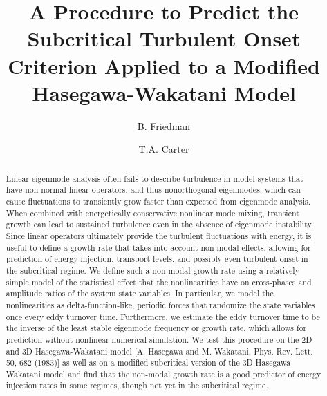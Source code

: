 \documentclass[twocolumn,showkeys,superscriptaddress]{revtex4}
\begin{document}
\title{A Procedure to Predict the Subcritical Turbulent Onset Criterion Applied to a Modified Hasegawa-Wakatani Model}

\author{B. Friedman}



\author{T.A. Carter}




\begin{abstract}
Linear eigenmode analysis often fails to describe turbulence in model
systems that have non-normal linear operators, and thus
nonorthogonal eigenmodes, which can cause fluctuations to transiently grow faster than expected from eigenmode analysis. When combined with energetically conservative nonlinear mode mixing, 
transient growth can lead to sustained turbulence even in the absence of eigenmode instability. 
Since linear operators ultimately provide the turbulent fluctuations with energy, it is useful to define a growth rate that takes into account non-modal effects, allowing for
prediction of energy injection, transport levels, and possibly even turbulent onset in the subcritical regime. 
We define such a non-modal growth rate using a relatively simple model
of the statistical effect that the nonlinearities have on cross-phases and amplitude ratios of the system state variables. 
In particular, we model the nonlinearities as delta-function-like, periodic forces that randomize the state variables once every eddy turnover time. Furthermore, we estimate the eddy turnover
time to be the inverse of the least stable eigenmode frequency or growth rate, which allows for prediction without nonlinear numerical simulation. We test this procedure on the 2D and 3D Hasegawa-Wakatani model
[A. Hasegawa and M. Wakatani, Phys. Rev. Lett. 50, 682 (1983)] as well as on a modified subcritical version of the 3D Hasegawa-Wakatani model and find that
the non-modal growth rate is a good predictor of energy injection rates in some regimes, though not yet in the subcritical regime.
\end{abstract}

\maketitle
\end{document}
